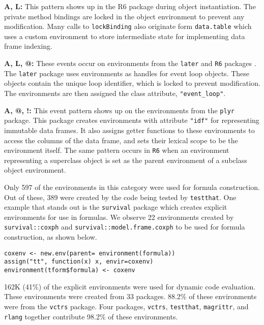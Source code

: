 \documentclass[10pt,review,sigplan,authorversion=true]{acmart}
\newcommand{\code}[1]{\lstinline |#1|\xspace}
\begin{document}
\noindent
\textbf{A, L:} This pattern shows up in the R6 package during object
instantiation. The private method bindings are locked in the object environment
to prevent any modification. Many calls to \code{lockBinding} also originate
form \code{data.table} which uses a custom environment to store intermediate
state for implementing data frame indexing.

\noindent
\textbf{A, L, @:} These events occur on environments from the \code{later} and
\code{R6} packages . The \code{later} package uses environments as handles for
event loop objects. These objects contain the unique loop identifier, which is
locked to prevent modification. The environments are then assigned the class
attribute, \code{"event_loop"}.

\noindent
\textbf{A, @, !:} This event pattern shows up on the environments from the
\code{plyr} package. This package creates environments with attribute
\code{"idf"} for representing immutable data frames. It also assigns getter
functions to these environments to access the columns of the data frame, and
sets their lexical scope to be the environment itself. The same pattern occurs
in \code{R6} when an environment representing a superclass object is set as the
parent environment of a subclass object environment.

Only 597 of the environments in this category were used for formula
construction. Out of these, 389 were created by the code being tested by
\code{testthat}. One example that stands out is the \code{survival} package
which creates explicit environments for use in formulas. We observe 22
environments created by \code{survival::coxph} and
\code{survival::model.frame.coxph} to be used for formula construction, as shown
below.

\begin{lstlisting}
coxenv <- new.env(parent= environment(formula))
assign("tt", function(x) x, envir=coxenv)
environment(tform$formula) <- coxenv
\end{lstlisting}

162K (41\%) of the explicit environments were used for dynamic code evaluation.
These environments were created from 33 packages. 88.2\% of these environments
were from the \code{vctrs} package. Four packages, \code{vctrs},
\code{testthat}, \code{magrittr}, and \code{rlang} together contribute 98.2\% of
these environments.
\end{document}

